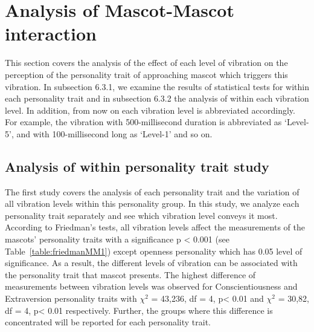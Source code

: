 \section{Analysis of Mascot-Mascot interaction}
\label{M-M}
This section covers the analysis of the effect of each level of vibration on the perception of the personality trait of approaching mascot which triggers this vibration. In subsection 6.3.1, we examine the results of statistical tests for within each personality trait and in subsection 6.3.2 the analysis of within each vibration level. In addition, from now on each vibration level is abbreviated accordingly. For example, the vibration with 500-millisecond duration is abbreviated as ‘Level-5’, and with 100-millisecond long as ‘Level-1’ and so on. 

\subsection{Analysis of within personality trait study}
\label{Study1(M-M)}
The first study covers the analysis of each personality trait and the variation of all vibration levels within this personality group. In this study, we analyze each personality trait separately and see which vibration level conveys it most. According to Friedman’s tests, all vibration levels affect the measurements of the mascots’ personality traits with a significance p < 0.001 (see Table~\ref{table:friedmanMM1}) except openness personality which has 0.05 level of significance. As a result, the different levels of vibration can be associated with the personality trait that mascot presents. The highest difference of measurements between vibration levels was observed for Conscientiousness and Extraversion personality traits with $\chi^2$ = 43,236, df = 4, p< 0.01 and $\chi^2$ = 30,82, df = 4, p< 0.01 respectively. Further, the groups where this difference is concentrated will be reported for each personality trait. 

